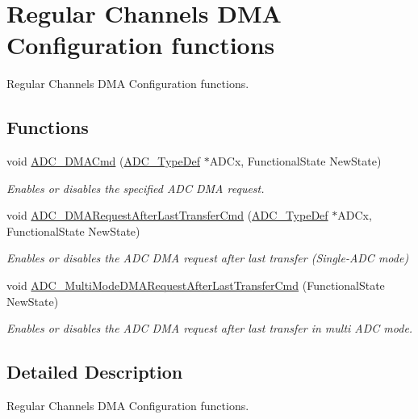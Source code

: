 \hypertarget{group___a_d_c___group5}{}\section{Regular Channels D\+MA Configuration functions}
\label{group___a_d_c___group5}


Regular Channels D\+MA Configuration functions.  


\subsection*{Functions}
\begin{DoxyCompactItemize}
\item 
void \hyperlink{group___a_d_c___group5_gac5881d5995818001584b27b137a8dbcb}{A\+D\+C\+\_\+\+D\+M\+A\+Cmd} (\hyperlink{struct_a_d_c___type_def}{A\+D\+C\+\_\+\+Type\+Def} $\ast$A\+D\+Cx, Functional\+State New\+State)
\begin{DoxyCompactList}\small\item\em Enables or disables the specified A\+DC D\+MA request. \end{DoxyCompactList}\item 
void \hyperlink{group___a_d_c___group5_ga912fd3e923ae4435621724e1bbc52729}{A\+D\+C\+\_\+\+D\+M\+A\+Request\+After\+Last\+Transfer\+Cmd} (\hyperlink{struct_a_d_c___type_def}{A\+D\+C\+\_\+\+Type\+Def} $\ast$A\+D\+Cx, Functional\+State New\+State)
\begin{DoxyCompactList}\small\item\em Enables or disables the A\+DC D\+MA request after last transfer (Single-\/\+A\+DC mode) \end{DoxyCompactList}\item 
void \hyperlink{group___a_d_c___group5_ga40f2be2edf2a33fc15f4a5933b562970}{A\+D\+C\+\_\+\+Multi\+Mode\+D\+M\+A\+Request\+After\+Last\+Transfer\+Cmd} (Functional\+State New\+State)
\begin{DoxyCompactList}\small\item\em Enables or disables the A\+DC D\+MA request after last transfer in multi A\+DC mode. \end{DoxyCompactList}\end{DoxyCompactItemize}


\subsection{Detailed Description}
Regular Channels D\+MA Configuration functions. 

